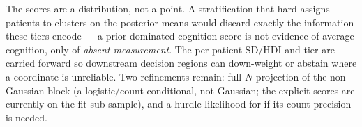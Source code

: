\begin{caveatbox}
The scores are a distribution, not a point. A stratification that hard-assigns patients to clusters on the
posterior means would discard exactly the information these tiers encode --- a prior-dominated cognition score
is not evidence of average cognition, only of \emph{absent measurement}. The per-patient SD/HDI and tier are
carried forward so downstream decision regions can down-weight or abstain where a coordinate is unreliable.
Two refinements remain: full-$N$ projection of the non-Gaussian block (a logistic/count conditional,
not Gaussian; the explicit scores are currently on the fit sub-sample), and a hurdle likelihood for
 if its count precision is needed.
\end{caveatbox}
